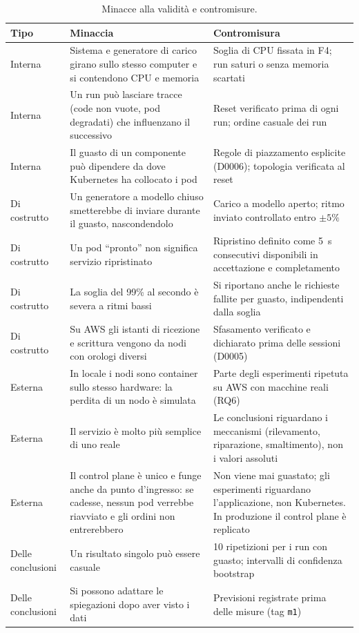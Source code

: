 \begin{table}[htbp]
\centering
\caption{Minacce alla validità e contromisure.}
\label{tab:limiti}
\begin{tabularx}{\linewidth}{@{}lLL@{}}
\toprule
\textbf{Tipo} & \textbf{Minaccia} & \textbf{Contromisura} \\
\midrule
Interna & Sistema e generatore di carico girano sullo stesso computer e si contendono CPU e memoria & Soglia di CPU fissata in F4; run saturi o senza memoria scartati \\
Interna & Un run può lasciare tracce (code non vuote, pod degradati) che influenzano il successivo & Reset verificato prima di ogni run; ordine casuale dei run \\
Interna & Il guasto di un componente può dipendere da dove Kubernetes ha collocato i pod & Regole di piazzamento esplicite (D0006); topologia verificata al reset \\
Di costrutto & Un generatore a modello chiuso smetterebbe di inviare durante il guasto, nascondendolo & Carico a modello aperto; ritmo inviato controllato entro $\pm5\%$ \\
Di costrutto & Un pod ``pronto'' non significa servizio ripristinato & Ripristino definito come 5~s consecutivi disponibili in accettazione e completamento \\
Di costrutto & La soglia del 99\% al secondo è severa a ritmi bassi & Si riportano anche le richieste fallite per guasto, indipendenti dalla soglia \\
Di costrutto & Su AWS gli istanti di ricezione e scrittura vengono da nodi con orologi diversi & Sfasamento verificato e dichiarato prima delle sessioni (D0005) \\
Esterna & In locale i nodi sono container sullo stesso hardware: la perdita di un nodo è simulata & Parte degli esperimenti ripetuta su AWS con macchine reali (RQ6) \\
Esterna & Il servizio è molto più semplice di uno reale & Le conclusioni riguardano i meccanismi (rilevamento, riparazione, smaltimento), non i valori assoluti \\
Esterna & Il control plane è unico e funge anche da punto d'ingresso: se cadesse, nessun pod verrebbe riavviato e gli ordini non entrerebbero & Non viene mai guastato; gli esperimenti riguardano l'applicazione, non Kubernetes. In produzione il control plane è replicato \\
Delle conclusioni & Un risultato singolo può essere casuale & 10 ripetizioni per i run con guasto; intervalli di confidenza bootstrap \\
Delle conclusioni & Si possono adattare le spiegazioni dopo aver visto i dati & Previsioni registrate prima delle misure (tag \texttt{m1}) \\
\bottomrule
\end{tabularx}
\end{table}
